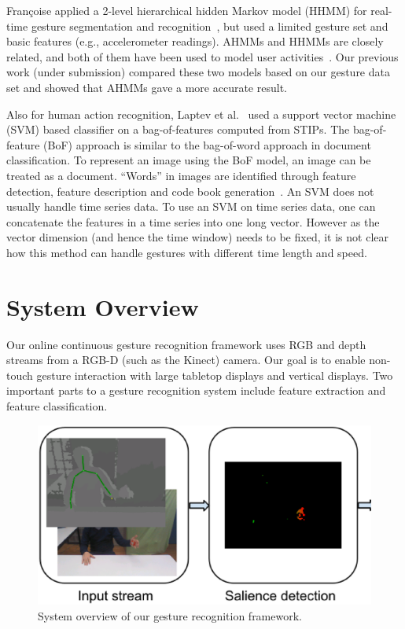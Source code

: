 \documentclass{sigchi}
\begin{document}
Fran\c coise applied a 2-level hierarchical hidden Markov model (HHMM) for real-time 
gesture segmentation and recognition~\cite{francoise10}, but used a limited gesture set and basic features (e.g., accelerometer readings).
AHMMs and HHMMs are closely related, and both of them have been used to model user activities~\cite{nguyen03, nguyen05}. Our
previous work (under submission) compared these two models based on our gesture data set and showed that AHMMs gave a more accurate result.

Also for human action recognition, Laptev et al.~\cite{laptev2008} used a support vector machine (SVM) based classifier
on a bag-of-features computed from STIPs. The bag-of-feature (BoF) approach is similar to the bag-of-word approach in document classification.
To represent an image using the BoF model, an image can be treated as a document. 
``Words'' in images are identified through feature detection, feature description and code book generation~\cite{fei2005}.
An SVM does not usually handle time series data. To use an SVM on time series data, one
can concatenate the features in a time series into one long vector. However as the vector dimension (and hence the time window) needs to be fixed, it is not clear how this method can handle
gestures with different time length and speed.

\section{System Overview}
Our online continuous gesture recognition framework uses RGB and depth streams from a RGB-D (such as the Kinect) camera. Our goal is to enable
non-touch gesture interaction
with large tabletop displays and vertical displays. Two important parts to a gesture recognition
system include feature extraction and feature classification.  

\begin{figure}
\centering
\includegraphics[width=1\linewidth]{figure/system.ps}
\caption{System overview of our gesture recognition framework. }
\label{fig:system}
\end{figure}
\end{document}

